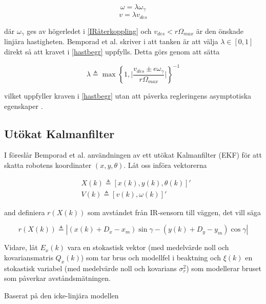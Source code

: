 \documentclass[11pt]{article}
\begin{document}
\begin{flushleft}
\begin{equation}
	\omega = \lambda \omega_\gamma
\end{equation}
\begin{equation}
	v = \lambda v_{des}
\end{equation}

där $\omega_\gamma$ ges av högerledet i \eqref{IRåterkoppling} och $v_{des} < r \Omega_{max}$ är den önskade linjära hastigheten. Bemporad et al. skriver i \cite{wfp} att tanken är att välja $\lambda \in [0,1]$ direkt så att kravet i \eqref{hastbegr} uppfylls. Detta görs genom att sätta

\begin{equation}\label{haståterkoppling}
	\lambda \triangleq \max{\left\{ 1, \bigg| \frac {v_{des} \pm e \omega_\gamma} {r \Omega_{max}} \bigg|  \right\}}^{-1}
\end{equation}

vilket uppfyller kraven i \eqref{hastbegr} utan att påverka regleringens asymptotiska egenskaper \cite{wfp}.

\subsection{Utökat Kalmanfilter}\label{EKF}
I \cite{wfp} föreslår Bemporad et al. användningen av ett utökat Kalmanfilter (EKF) för att skatta robotens koordinater $(x,y,\theta)$. Låt oss införa vektorerna 

\begin{equation*}
	\begin{aligned}
	&X(k) \triangleq [x(k), y(k), \theta(k)]' \\
	&V(k) \triangleq [v(k), \omega(k)]'
	\end{aligned}
\end{equation*}

and definiera $r(X(k))$ som avståndet från IR-sensorn till väggen, det vill säga

\begin{equation*}
	r(X(k)) \triangleq | (x(k) + D_x - x_m) \sin \gamma - (y(k) + D_y - y_m) \cos \gamma |
\end{equation*}

Vidare, låt $E_x(k)$ vara en stokastisk vektor (med medelvärde noll och kovariansmatris $Q_x(k)$) som tar brus och modellfel i beaktning och $\xi(k)$ en stokastisk variabel (med medelvärde noll och kovarians $\sigma_r^2$) som modellerar bruset som påverkar avståndsmätningen.

Baserat på den icke-linjära modellen 


\end{flushleft}
\end{document}
